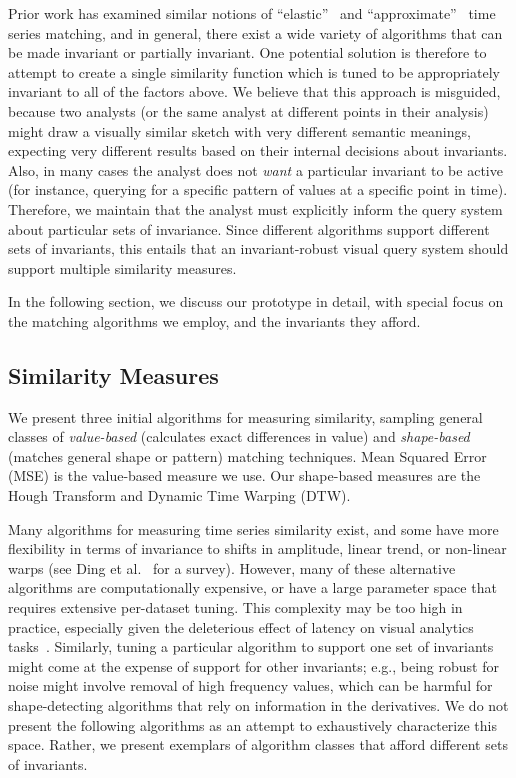 Prior work has examined  similar notions of ``elastic''~\cite{ding2008querying} and ``approximate''~\cite{shatkay1996approximate} time series matching, and in general, there exist a wide variety of algorithms that can be made invariant or partially invariant. One potential solution is therefore to attempt to create a single similarity function which is tuned to be appropriately invariant to all of the factors above. We believe that this approach is misguided, because two analysts (or the same analyst at different points in their analysis) might draw a visually similar sketch with very different semantic meanings, expecting very different results based on their internal decisions about invariants. Also, in many cases the analyst does not \emph{want} a particular invariant to be active (for instance, querying for a specific pattern of values at a specific point in time). Therefore, we maintain that the analyst must explicitly inform the query system about particular sets of invariance. Since different algorithms support different sets of invariants, this entails that an invariant-robust visual query system should support multiple similarity measures.

In the following section, we discuss our prototype in detail, with special focus on the matching algorithms we employ, and the invariants they afford.

\subsection{Similarity Measures}

We present three initial algorithms for measuring similarity, sampling general classes of \emph{value-based} (calculates exact differences in value) and \emph{shape-based} (matches general shape or pattern) matching techniques. Mean Squared Error (MSE) is the value-based measure we use. Our shape-based measures are the Hough Transform and Dynamic Time Warping (DTW).

Many algorithms for measuring time series similarity exist, and some have more flexibility in terms of invariance to shifts in amplitude, linear trend, or non-linear warps (see Ding et al.~\cite{ding2008querying} for a survey). However, many of these alternative algorithms are computationally expensive, or have a large parameter space that requires extensive per-dataset tuning. This complexity may be too high in practice, especially given the deleterious effect of latency on visual analytics tasks~\cite{liu2014effects}. Similarly, tuning a particular algorithm to support one set of invariants might come at the expense of support for other invariants; e.g., being robust for noise might involve removal of high frequency values, which can be harmful for shape-detecting algorithms that rely on information in the derivatives. We do not present the following algorithms as an attempt to exhaustively characterize this space. Rather, we present exemplars of algorithm classes that afford different sets of invariants.

